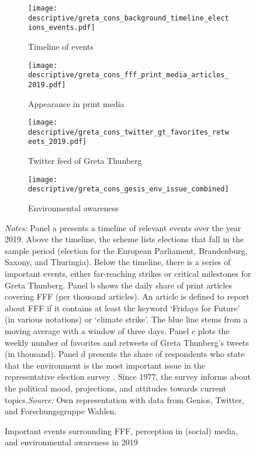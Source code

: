 \begin{landscape}
	\vspace*{\fill}
	\begin{figure}[H]\centering
		\begin{subfigure}[h]{0.85\linewidth}\centering\caption{Timeline of events}\centering
			\texttt{[image: descriptive/greta\_cons\_background\_timeline\_elections\_events.pdf]}
		\end{subfigure}
		
		\par\smallskip %
		\begin{subfigure}[h]{0.29\linewidth}\centering\caption{Appearance in print media}
			\texttt{[image: descriptive/greta\_cons\_fff\_print\_media\_articles\_2019.pdf]}
		\end{subfigure}
		\begin{subfigure}[h]{0.29\linewidth}\centering\caption{Twitter feed of Greta Thunberg}
			\texttt{[image: descriptive/greta\_cons\_twitter\_gt\_favorites\_retweets\_2019.pdf]}
		\end{subfigure}
		\begin{subfigure}[h]{0.29\linewidth}\centering\caption{Environmental awareness}
			\texttt{[image: descriptive/greta\_cons\_gesis\_env\_issue\_combined]}
		\end{subfigure}

		\begin{minipage}{\linewidth}
			\caption{Important events surrounding FFF, perception in (social) media, and environmental awareness in 2019}\label{fig_greta_cons:timeline_media_awareness}
			\scriptsize{\emph{Notes:} Panel a presents a timeline of relevant events over the year 2019. Above the timeline, the scheme lists elections that fall in the sample period (election for the European Parliament, Brandenburg, Saxony, and Thuringia). Below the timeline, there is a series of important events, either far-reaching strikes or critical milestones for Greta Thunberg. Panel b shows the daily share of print articles covering FFF (per thousand articles). An article is defined to report about FFF if it contains at least the keyword `Fridays for Future' (in various notations) or `climate strike'. The blue line stems from a moving average with a window of three days. Panel c plots the weekly number of favorites and retweets of Greta Thunberg's tweets (in thousand). Panel d presents the share of respondents who state that the environment is the most important issue in the representative election survey \cite{politbarometer2019}. Since 1977, the survey informs about the political mood, projections, and attitudes towards current topics.\newline \emph{Source:} Own representation with data from Genios, Twitter, and Forschungsgruppe Wahlen.}
		\end{minipage}
	\end{figure}
	\vspace*{\fill}\clearpage
\end{landscape}
\restoregeometry